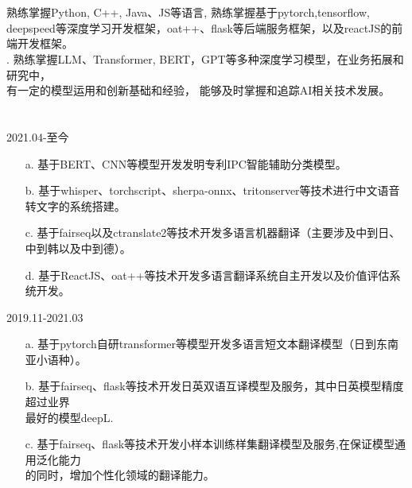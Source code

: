 \documentclass[margin]{res}
\begin{document}
\begin{resume}
\section{ }
            {} 熟练掌握Python, C++, Java、JS等语言, 熟练掌握基于pytorch,tensorflow, deepspeed等深度学习开发框架，oat++、flask等后端服务框架，以及reactJS的前端开发框架。 \\
            {} . 熟练掌握LLM、Transformer, BERT，GPT等多种深度学习模型，在业务拓展和研究中，\\有一定的模型运用和创新基础和经验， 能够及时掌握和追踪AI相关技术发展。\\

\section{} 
                { }  \hfill 2021.04-至今
                \begin{itemize}  \itemsep -2pt %
                \item[a.] 基于BERT、CNN等模型开发发明专利IPC智能辅助分类模型。
                \item[b.] 基于whisper、torchscript、sherpa-onnx、tritonserver等技术进行中文语音转文字的系统搭建。
                \item[c.] 基于fairseq以及ctranslate2等技术开发多语言机器翻译（主要涉及中到日、中到韩以及中到德）。
                \item[d.] 基于ReactJS、oat++等技术开发多语言翻译系统自主开发以及价值评估系统开发。
                 
                \end{itemize}
                { }  \hfill 2019.11-2021.03
                 \begin{itemize}  \itemsep -2pt %
                 \item[a.] 基于pytorch自研transformer等模型开发多语言短文本翻译模型（日到东南亚小语种）。
                \item[b.]  基于fairseq、flask等技术开发日英双语互译模型及服务，其中日英模型精度超过业界\\最好的模型deepL.
                \item[c.] 基于fairseq、flask等技术开发小样本训练样集翻译模型及服务,在保证模型通用泛化能力\\的同时，增加个性化领域的翻译能力。
                
                \end{itemize}
 

\end{resume}
\end{document}
